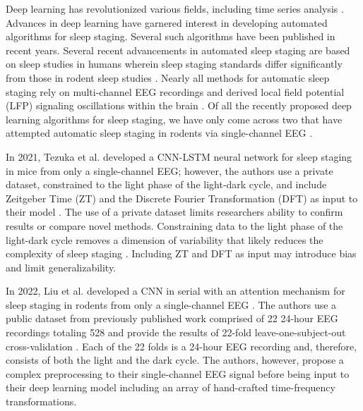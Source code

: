 \documentclass[pdflatex,sn-mathphys-num]{sn-jnl}%
\theoremstyle{thmstyleone}%
\theoremstyle{thmstyletwo}%
\theoremstyle{thmstylethree}%
\begin{document}
Deep learning has revolutionized various fields, including time series analysis \cite{smith_toward_2024,chien_maeeg_2022,vaswani_attention_2023,he_deep_2015,krizhevsky_imagenet_2012}. Advances in deep learning have garnered interest in developing automated algorithms for sleep staging. Several such algorithms have been published in recent years. Several recent advancements in automated sleep staging are based on sleep studies in humans \cite{supratak_deepsleepnet_2017,vallat_open-source_2021,perslev_u-time_2019,Smith_Anand_Milosavljevic_Rentschler_Pocivavsek_Valafar_2022} wherein sleep staging standards differ significantly from those in rodent sleep studies \cite{rayan_sleep_2024}. Nearly all methods for automatic sleep staging rely on multi-channel EEG recordings and derived local field potential (LFP) signaling oscillations within the brain \cite{miladinovic_spindle_2019,gao_multiple_2016,gross_open-source_2009,stephenson_automated_2009,louis_design_2004,ellen_artificial_2021}. Of all the recently proposed deep learning algorithms for sleep staging, we have only come across two that have attempted automatic sleep staging in rodents via single-channel EEG \cite{tezuka_real-time_2021,liu_attention-based_2022}. 

In 2021, Tezuka et al. developed a CNN-LSTM neural network for sleep staging in mice from only a single-channel EEG; however, the authors use a private dataset, constrained to the light phase of the light-dark cycle, and include Zeitgeber Time (ZT) and the Discrete Fourier Transformation (DFT) as input to their model \cite{tezuka_real-time_2021}. The use of a private dataset limits researchers ability to confirm results or compare novel methods. Constraining data to the light phase of the light-dark cycle removes a dimension of variability that likely reduces the complexity of sleep staging \cite{shannon_mathematical_1948}. Including ZT and DFT as input may introduce bias and limit generalizability.

In 2022, Liu et al. developed a CNN in serial with an attention mechanism for sleep staging in rodents from only a single-channel EEG \cite{liu_attention-based_2022}. The authors use a public dataset from previously published work \cite{miladinovic_spindle_2019} comprised of 22 24-hour EEG recordings totaling 528 and provide the results of 22-fold leave-one-subject-out cross-validation \cite{liu_attention-based_2022}. Each of the 22 folds is a 24-hour EEG recording and, therefore, consists of both the light and the dark cycle. The authors, however, propose a complex preprocessing to their single-channel EEG signal before being input to their deep learning model including an array of hand-crafted time-frequency transformations.
\end{document}

